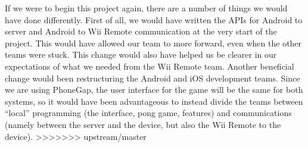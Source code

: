 \documentclass[12pt]{article}
\begin{document}
If we were to begin this project again, there are a number of things we would have done differently.  First of all, we would have written the APIs for Android to server and Android to Wii Remote communication at the very start of the project.  This would have allowed our team to more forward, even when the other teams were stuck.  This change would also have helped us be clearer in our expectations of what we needed from the Wii Remote team.  Another beneficial change would been restructuring the Android and iOS development teams.  Since we are using PhoneGap, the user interface for the game will be the same for both systems, so it would have been advantageous to instead divide the teams between “local” programming (the interface, pong game, features) and communications (namely between the server and the device, but also the Wii Remote to the device). 
>>>>>>> upstream/master
\end{document}
